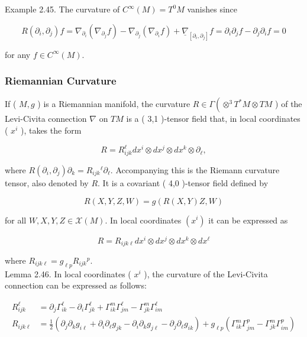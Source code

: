 \documentclass[10pt, letterpaper]{article}
\begin{document}
Example 2.45. The curvature of $C^{\infty}(M)=T^{0} M$ vanishes since

$$
R\left(\partial_{i}, \partial_{j}\right) f=\nabla_{\partial_{i}}\left(\nabla_{\partial_{j}} f\right)-\nabla_{\partial_{j}}\left(\nabla_{\partial_{i}} f\right)+\underline{\nabla}_{\left[\partial_{i}, \partial_{j}\right]} f=\partial_{i} \partial_{j} f-\partial_{j} \partial_{i} f=0
$$

for any $f \in C^{\infty}(M)$.

\subsubsection*{Riemannian Curvature}
If ( $M, g$ ) is a Riemannian manifold, the curvature $R \in \Gamma\left(\otimes^{3} T^{*} M \otimes T M\right.$ ) of the Levi-Civita connection $\nabla$ on $T M$ is a ( 3,1 )-tensor field that, in local coordinates ( $x^{i}$ ), takes the form

$$
R=R_{i j k}^{\ell} d x^{i} \otimes d x^{j} \otimes d x^{k} \otimes \partial_{\ell},
$$

where $R\left(\partial_{i}, \partial_{j}\right) \partial_{k}=R_{i j k}{ }^{\ell} \partial_{\ell}$. Accompanying this is the Riemann curvature tensor, also denoted by $R$. It is a covariant ( 4,0 )-tensor field defined by

$$
R(X, Y, Z, W)=g(R(X, Y) Z, W)
$$

for all $W, X, Y, Z \in \mathscr{X}(M)$. In local coordinates $\left(x^{i}\right)$ it can be expressed as

$$
R=R_{i j k \ell} d x^{i} \otimes d x^{j} \otimes d x^{k} \otimes d x^{\ell}
$$

where $R_{i j k \ell}=g_{\ell p} R_{i j k}{ }^{p}$.\\
Lemma 2.46. In local coordinates ( $x^{i}$ ), the curvature of the Levi-Civita connection can be expressed as follows:

$$
\begin{aligned}
R_{i j k}^{\ell} & =\partial_{j} \Gamma_{i k}^{\ell}-\partial_{i} \Gamma_{j k}^{\ell}+\Gamma_{i k}^{m} \Gamma_{j m}^{\ell}-\Gamma_{j k}^{m} \Gamma_{i m}^{\ell} \\
R_{i j k \ell} & =\frac{1}{2}\left(\partial_{j} \partial_{k} g_{i \ell}+\partial_{i} \partial_{\ell} g_{j k}-\partial_{i} \partial_{k} g_{j \ell}-\partial_{j} \partial_{\ell} g_{i k}\right)+g_{\ell p}\left(\Gamma_{i k}^{m} \Gamma_{j m}^{p}-\Gamma_{j k}^{m} \Gamma_{i m}^{p}\right)
\end{aligned}
$$
\end{document}
